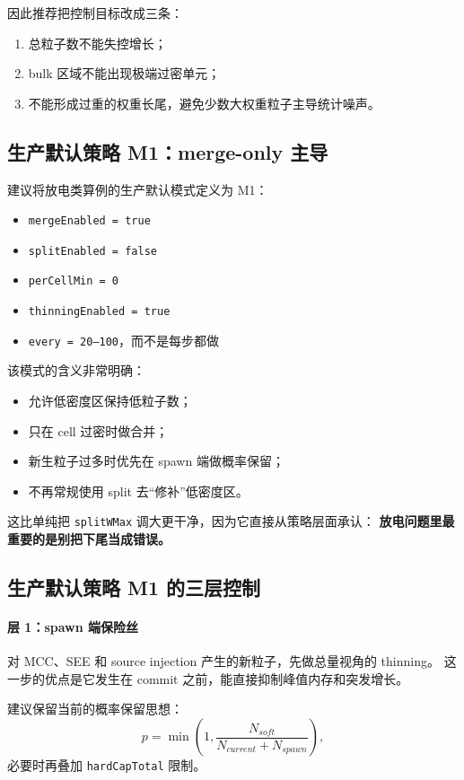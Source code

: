 \documentclass[UTF8,11pt,a4paper]{ctexart}
\begin{document}
因此推荐把控制目标改成三条：
\begin{enumerate}[itemsep=3pt]
  \item 总粒子数不能失控增长；
  \item bulk 区域不能出现极端过密单元；
  \item 不能形成过重的权重长尾，避免少数大权重粒子主导统计噪声。
\end{enumerate}

\subsection{生产默认策略 M1：merge-only 主导}

建议将放电类算例的生产默认模式定义为 M1：
\begin{itemize}[itemsep=3pt]
  \item \texttt{mergeEnabled = true}
  \item \texttt{splitEnabled = false}
  \item \texttt{perCellMin = 0}
  \item \texttt{thinningEnabled = true}
  \item \texttt{every = 20--100}，而不是每步都做
\end{itemize}

该模式的含义非常明确：
\begin{itemize}[itemsep=2pt]
  \item 允许低密度区保持低粒子数；
  \item 只在 cell 过密时做合并；
  \item 新生粒子过多时优先在 spawn 端做概率保留；
  \item 不再常规使用 split 去“修补”低密度区。
\end{itemize}

这比单纯把 \texttt{splitWMax} 调大更干净，因为它直接从策略层面承认：
\textbf{放电问题里最重要的是别把下尾当成错误。}

\subsection{生产默认策略 M1 的三层控制}

\paragraph{层 1：spawn 端保险丝}
对 MCC、SEE 和 source injection 产生的新粒子，先做总量视角的 thinning。
这一步的优点是它发生在 commit 之前，能直接抑制峰值内存和突发增长。

建议保留当前的概率保留思想：
\[
p = \min\left(1, \frac{N_{soft}}{N_{current}+N_{spawn}}\right),
\]
必要时再叠加 \texttt{hardCapTotal} 限制。
\end{document}
